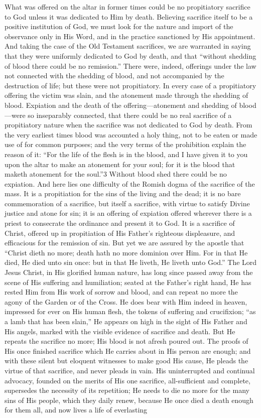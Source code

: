 \documentclass[]{book}
\begin{document}
What was offered on the altar in former times could be no propitiatory sacrifice to God unless it was dedicated to Him by death. Believing sacrifice itself to be a positive institution of God, we must look for the nature and import of the observance only in His Word, and in the practice sanctioned by His appointment. And taking the case of the Old Testament sacrifices, we are warranted in saying that they were uniformly dedicated to God by death, and that ``without shedding of blood there could be no remission.'' There were, indeed, offerings under the law not connected with the shedding of blood, and not accompanied by the destruction of life; but these were not propitiatory. In every case of a propitiatory offering the victim was slain, and the atonement made through the shedding of blood. Expiation and the death of the offering---atonement and shedding of blood---were so inseparably connected, that there could be no real sacrifice of a propitiatory nature when the sacrifice was not dedicated to God by death. From the very earliest times blood was accounted a holy thing, not to be eaten or made use of for common purposes; and the very terms of the prohibition explain the reason of it: ``For the life of the flesh is in the blood, and I have given it to you upon the altar to make an atonement for your soul; for it is the blood that maketh atonement for the soul.''3 Without blood shed there could be no expiation. And here lies one difficulty of the Romish dogma of the sacrifice of the mass. It is a propitiation for the sins of the living and the dead; it is no bare commemoration of a sacrifice, but itself a sacrifice, with virtue to satisfy Divine justice and atone for sin; it is an offering of expiation offered wherever there is a priest to consecrate the ordinance and present it to God. It is a sacrifice of Christ, offered up in propitiation of His Father's righteous displeasure, and efficacious for the remission of sin. But yet we are assured by the apostle that ``Christ dieth no more; death hath no more dominion over Him. For in that He died, He died unto sin once: but in that He liveth, He liveth unto God.'' The Lord Jesus Christ, in His glorified human nature, has long since passed away from the scene of His suffering and humiliation; seated at the Father's right hand, He has rested Him from His work of sorrow and blood, and can repeat no more the agony of the Garden or of the Cross. He does bear with Him indeed in heaven, impressed for ever on His human flesh, the tokens of suffering and crucifixion; ``as a lamb that has been slain,'' He appears on high in the sight of His Father and His angels, marked with the visible evidence of sacrifice and death. But He repeats the sacrifice no more; His blood is not afresh poured out. The proofs of His once finished sacrifice which He carries about in His person are enough; and with these silent but eloquent witnesses to make good His cause, He pleads the virtue of that sacrifice, and never pleads in vain. His uninterrupted and continual advocacy, founded on the merits of His one sacrifice, all-sufficient and complete, supersedes the necessity of its repetition; He needs to die no more for the many sins of His people, which they daily renew, because He once died a death enough for them all, and now lives a life of everlasting 
\end{document}
